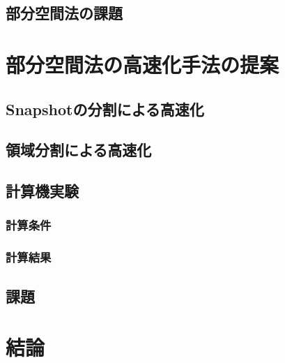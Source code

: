 \documentclass[a4j,12pt]{jreport}
\begin{document}
\section{部分空間法の課題}

\chapter{部分空間法の高速化手法の提案} \label{chapter:3}
	\section{Snapshotの分割による高速化}
	\section{領域分割による高速化}
	\section{計算機実験}
		\subsection{計算条件}
		\subsection{計算結果}
	\section{課題}
\chapter{結論}


\end{document}
